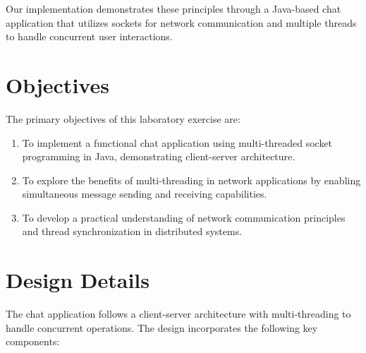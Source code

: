 \documentclass[12pt,a4paper]{article}
\begin{document}
Our implementation demonstrates these principles through a Java-based chat application that utilizes sockets for network communication and multiple threads to handle concurrent user interactions.

\section{Objectives}
The primary objectives of this laboratory exercise are:

\begin{enumerate}
    \item To implement a functional chat application using multi-threaded socket programming in Java, demonstrating client-server architecture.
    
    \item To explore the benefits of multi-threading in network applications by enabling simultaneous message sending and receiving capabilities.
    
    \item To develop a practical understanding of network communication principles and thread synchronization in distributed systems.
\end{enumerate}

\section{Design Details}
The chat application follows a client-server architecture with multi-threading to handle concurrent operations. The design incorporates the following key components:
\end{document}
